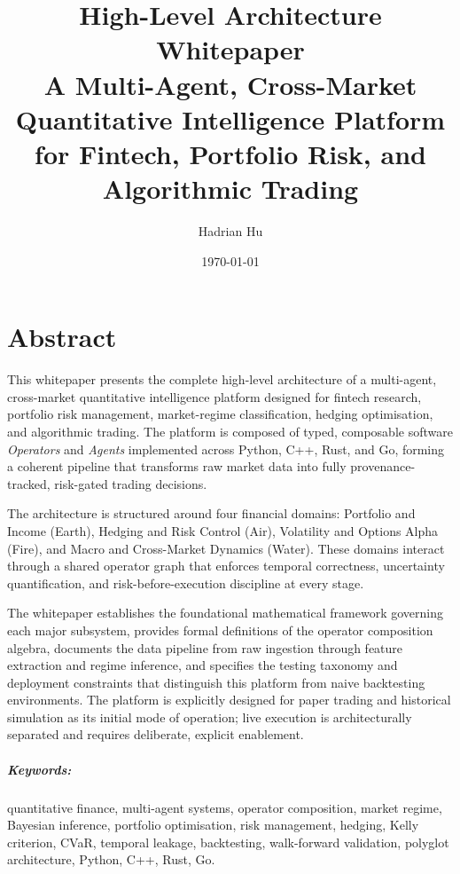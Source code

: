\documentclass[12pt,openany]{book}
\title{%
    \textbf{High-Level Architecture Whitepaper}\\[0.5em]
    \large A Multi-Agent, Cross-Market Quantitative Intelligence Platform\\
    for Fintech, Portfolio Risk, and Algorithmic Trading
}
\author{Hadrian Hu}
\date{\today}
\numberwithin{equation}{chapter}
\theoremstyle{plain}
\theoremstyle{definition}
\theoremstyle{remark}
\begin{document}
\maketitle
\tableofcontents

\chapter*{Abstract}

This whitepaper presents the complete high-level architecture of a
multi-agent, cross-market quantitative intelligence platform designed
for fintech research, portfolio risk management, market-regime classification,
hedging optimisation, and algorithmic trading. The platform is composed
of typed, composable software \emph{Operators} and \emph{Agents} implemented
across Python, C++, Rust, and Go, forming a coherent pipeline that transforms
raw market data into fully provenance-tracked, risk-gated trading decisions.

The architecture is structured around four financial domains: Portfolio and
Income (Earth), Hedging and Risk Control (Air), Volatility and Options Alpha
(Fire), and Macro and Cross-Market Dynamics (Water). These domains interact
through a shared operator graph that enforces temporal correctness, uncertainty
quantification, and risk-before-execution discipline at every stage.

The whitepaper establishes the foundational mathematical framework governing
each major subsystem, provides formal definitions of the operator composition
algebra, documents the data pipeline from raw ingestion through feature
extraction and regime inference, and specifies the testing taxonomy and
deployment constraints that distinguish this platform from naive backtesting
environments. The platform is explicitly designed for paper trading and
historical simulation as its initial mode of operation; live execution is
architecturally separated and requires deliberate, explicit enablement.

\paragraph*{Keywords:} quantitative finance, multi-agent systems, operator
composition, market regime, Bayesian inference, portfolio optimisation,
risk management, hedging, Kelly criterion, CVaR, temporal leakage, backtesting,
walk-forward validation, polyglot architecture, Python, C++, Rust, Go.
\end{document}

